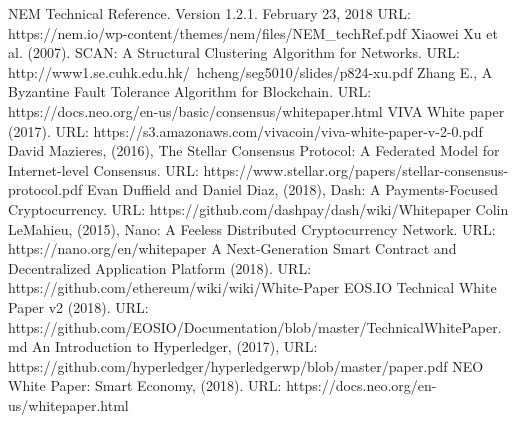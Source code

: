 \documentclass[a4paper,12pt]{article}
\begin{document}
\begin{thebibliography}{99}
  NEM Technical Reference. Version 1.2.1. February 23, 2018 URL: https://nem.io/wp-content/themes/nem/files/NEM\_techRef.pdf
 Xiaowei Xu et al. (2007). SCAN: A Structural Clustering Algorithm for Networks. URL: http://www1.se.cuhk.edu.hk/~hcheng/seg5010/slides/p824-xu.pdf
 Zhang E., A Byzantine Fault Tolerance Algorithm for Blockchain. URL: https://docs.neo.org/en-us/basic/consensus/whitepaper.html
 VIVA White paper (2017). URL: https://s3.amazonaws.com/vivacoin/viva-white-paper-v-2-0.pdf
 David Mazieres, (2016), The Stellar Consensus Protocol: A Federated Model for Internet-level Consensus. URL: https://www.stellar.org/papers/stellar-consensus-protocol.pdf
 Evan Duffield and Daniel Diaz, (2018), Dash: A Payments-Focused Cryptocurrency. URL: https://github.com/dashpay/dash/wiki/Whitepaper
 Colin LeMahieu, (2015), Nano: A Feeless Distributed Cryptocurrency Network. URL: https://nano.org/en/whitepaper
 A Next-Generation Smart Contract and Decentralized Application Platform (2018). URL: https://github.com/ethereum/wiki/wiki/White-Paper
 EOS.IO Technical White Paper v2 (2018). URL: https://github.com/EOSIO/Documentation/blob/master/TechnicalWhitePaper.md
 An Introduction to Hyperledger, (2017), URL: https://github.com/hyperledger/hyperledgerwp/blob/master/paper.pdf
 NEO White Paper: Smart Economy, (2018). URL: https://docs.neo.org/en-us/whitepaper.html
\end{thebibliography}
\end{document}
